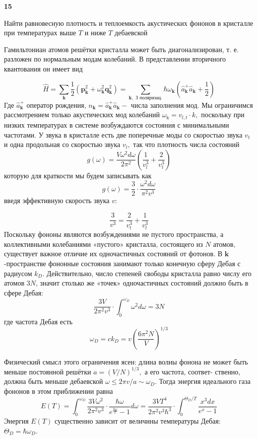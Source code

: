 \documentclass[a4paper,12pt]{article} %
\begin{document}
\begin{ttask}\textbf{15}

Найти равновесную плотность и теплоемкость акустических фононов в кристалле при температурах выше $ T $  и ниже $ T $  дебаевской




Гамильтониан атомов решётки кристалла может быть диагонализирован, 
т. е. разложен по нормальным модам колебаний. 
В представлении вторичного квантования он имеет вид



$$
	\hat{H}=\sum_{\mathbf{k}} \frac{1}{2}\left(\mathbf{p}_{\mathbf{k}}^{2}+\omega_{\mathbf{k}}^{2} \mathbf{q}_{\mathbf{k}}^{2}\right)=\sum_{\mathbf{k}, \text { З поляризац.}}  \hbar \omega_{\mathbf{k}}\left(\hat{a}_{\mathbf{k}}^{+} \hat{a}_{\mathbf{k}}+\frac{1}{2}\right)
$$
Где $\hat{a}_{\mathbf{k}}^{+}$ оператор рождения, $n_{\mathbf{k}}=\hat{a}_{\mathbf{k}}^{+} \hat{a}_{\mathbf{k}}-$ числа заполнения мод. 
Мы ограничимся рассмотрением только акустических мод колебаний $\omega_{\mathrm{k}}=v_{l, t} \cdot k,$ 
поскольку при низких температурах в системе возбуждаются состояния с минимальными частотами. 
У звука в кристалле есть две поперечные моды со скоростью звука $v_{t}$ и одна продольная со скоростью звука
$v_{l},$ так что плотность числа состояний
$$
g(\omega)=\frac{V \omega^{2} d \omega}{2 \pi^{2}}\left(\frac{1}{v_{l}^{3}}+\frac{2}{v_{t}^{3}}\right)
$$
которую для краткости мы будем записывать как
$$
g(\omega)=\frac{3}{2} \cdot \frac{\omega^{2} d \omega}{\pi^{2} v^{3}}
$$
введя эффективную скорость звука $v:$


$$
\frac{3}{v^{3}}=\frac{2}{v_{t}^{3}}+\frac{1}{v_{l}^{3}}
$$
Поскольку фононы являются возбуждениями не пустого пространства, а коллективными колебаниями «пустого» кристалла, 
состоящего из $N$ атомов, существует важное отличие их одночастичных состояний от фотонов. 
В $\mathbf{k}$ -пространстве фононные состояния занимают только конечную сферу Дебая с радиусом $k_{D}$. 
Действительно, число степеней свободы кристалла равно числу его атомов $3 N$, 
значит столько же «точек» одночастичных состояний должно быть в сфере Дебая:
$$
\frac{3 V}{2 \pi^{2} v^{3}} 
\cdot 
\int_{0}^{\omega_{D}} \omega^{2} d \omega
=3 N
$$
где частота Дебая есть
$$
\omega_{D}
=
c k_{D}
=
v\left(\frac{6 \pi^{2} N}{V}\right)^{1 / 3}
$$



Физический смысл этого ограничения ясен: длина волны фонона не может быть меньше 
постоянной решётки $a=(V / N)^{1 / 3},$ а его частота, соответ-
ственно, должна быть меньше дебаевской $\omega \leq 2 \pi v / a \sim \omega_{D} .$ 
Тогда энергия идеального газа фононов в этом приближении равна
$$
E(T)=\int_{0}^{\omega_{D}} \frac{3 V \omega^{2}}{2 \pi^{2} v^{3}} \cdot \frac{\hbar \omega}{e^{\frac{h \omega}{T}}-1} d \omega
=
\frac{3 V T^{4}}{2 \pi^{2} v^{3} \hbar^{3}} \cdot \int_{0}^{\Theta_{D} / T} \frac{x^{3} d x}{e^{x}-1}
$$
Энергия $E(T)$ существенно зависит от величины температуры Дебая:
$\Theta_{D}=\hbar \omega_{D} .$ 



\end{ttask}
\end{document}
